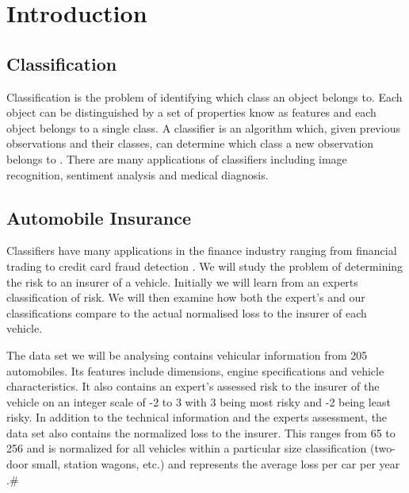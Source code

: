\chapter{Introduction}

\section{Classification}

Classification is the problem of identifying which class an object belongs to.
Each object can be distinguished by a set of properties know as features and each object belongs to a single class.
A classifier is an algorithm which, given previous observations and their classes, can determine which class a new observation belongs to \cite{Theodoridis03}.
There are many applications of classifiers including image recognition, sentiment analysis and medical diagnosis.

\section{Automobile Insurance}

Classifiers have many applications in the finance industry ranging from financial trading \cite{Gerlein16} to credit card fraud detection \cite{Pozzolo15}.
We will study the problem of determining the risk to an insurer of a vehicle.
Initially we will learn from an experts classification of risk.
We will then examine how both the expert's and our classifications compare to the actual normalised loss to the insurer of each vehicle.

The data set we will be analysing contains vehicular information from 205 automobiles.
Its features include dimensions, engine specifications and vehicle characteristics.
It also contains an expert's assessed risk to the insurer of the vehicle on an integer scale of -2 to 3 with 3 being most risky and -2 being least risky.
In addition to the technical information and the experts assessment, the data set also contains the normalized loss to the insurer.
This ranges from 65 to 256 and is normalized for all vehicles within a particular size classification (two-door small, station wagons, etc.) and represents the average loss per car per year \cite{Automobile}.#